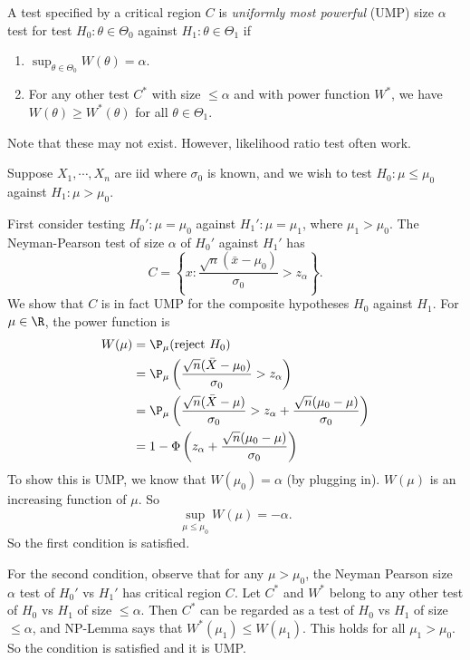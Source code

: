 \documentclass[a4paper]{article}
\begin{document}
\begin{defi}
  A test specified by a critical region $C$ is \emph{uniformly most powerful} (UMP) size $\alpha$ test for test $H_0:\theta\in \Theta_0$ against $H_1: \theta \in \Theta_1$ if
  \begin{enumerate}
    \item $\sup_{\theta\in \Theta_0} W(\theta) = \alpha$.
    \item For any other test $C^*$ with size $\leq \alpha$ and with power function $W^*$, we have $W(\theta) \geq W^*(\theta)$ for all $\theta\in \Theta_1$.
  \end{enumerate}
  Note that these may not exist. However, likelihood ratio test often work.
\end{defi}

\begin{eg}
  Suppose $X_1, \cdots, X_n$ are iid where $\sigma_0$ is known, and we wish to test $H_0: \mu\leq \mu_0$ against $H_1: \mu > \mu_0$.

  First consider testing $H_0': \mu = \mu_0$ against $H_1': \mu = \mu_1$, where $\mu_1 > \mu_0$. The Neyman-Pearson test of size $\alpha$ of $H_0'$ against $H_1'$ has
  \[
    C = \left\{x: \frac{\sqrt{n}(\bar x - \mu_0)}{\sigma_0} >  z_\alpha\right\}.
  \]
  We show that $C$ is in fact UMP for the composite hypotheses $H_0$ against $H_1$. For $\mu\in \R$, the power function is
  \begin{align*}
    W(\mu) &= \P_\mu(\text{reject } H_0)\\
    &= \P_\mu\left(\frac{\sqrt{n}(\bar X - \mu_0)}{\sigma_0} > z_\alpha\right)\\
    &= \P_\mu\left(\frac{\sqrt{n}(\bar X - \mu)}{\sigma_0} > z_\alpha + \frac{\sqrt{n}(\mu_0 - \mu)}{\sigma_0}\right)\\
    &= 1 - \Phi\left(z_\alpha + \frac{\sqrt{n}(\mu_0 - \mu)}{\sigma_0}\right)
  \end{align*}
  To show this is UMP, we know that $W(\mu_0) = \alpha$ (by plugging in). $W(\mu)$ is an increasing function of $\mu$. So
  \[
    \sup_{ \mu \leq \mu_0} W(\mu) =- \alpha.
  \]
  So the first condition is satisfied.

  For the second condition, observe that for any $\mu > \mu_0$, the Neyman Pearson size $\alpha$ test of $H_0'$ vs $H_1'$ has critical region $C$. Let $C^*$ and $W^*$ belong to any other test of $H_0$ vs $H_1$ of size $\leq \alpha$. Then $C^*$ can be regarded as a test of $H_0$ vs $H_1$ of size $\leq \alpha$, and NP-Lemma says that $W^*(\mu_1) \leq W(\mu_1)$. This holds for all $\mu_1 > \mu_0$. So the condition is satisfied and it is UMP.
\end{eg}
\end{document}
